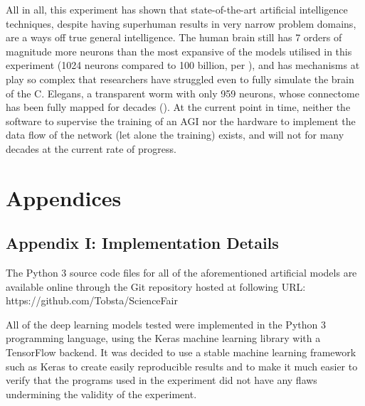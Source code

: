 \documentclass[]{report}
\begin{document}
All in all, this experiment has shown that state-of-the-art artificial intelligence techniques, despite having superhuman results in very narrow problem domains, are a ways off true general intelligence. The human brain still has 7 orders of magnitude more neurons than the most expansive of the models utilised in this experiment (1024 neurons compared to 100 billion, per \cite{herculano2009human}), and has mechanisms at play so complex that researchers have struggled even to fully simulate the brain of the C. Elegans, a transparent worm with only 959 neurons, whose connectome has been fully mapped for decades (\cite{wormwiring2012}). At the current point in time, neither the software to supervise the training of an AGI nor the hardware to implement the data flow of the network (let alone the training) exists, and will not for many decades at the current rate of progress.

\section{Appendices}

\subsection{Appendix I: Implementation Details}

The Python 3 source code files for all of the aforementioned artificial models are available online through the Git repository hosted at following URL: https://github.com/Tobsta/ScienceFair

All of the deep learning models tested were implemented in the Python 3 programming language, using the Keras machine learning library with a TensorFlow backend. It was decided to use a stable machine learning framework such as Keras to create easily reproducible results and to make it much easier to verify that the programs used in the experiment did not have any flaws undermining the validity of the experiment.

\twocolumn
\end{document}
